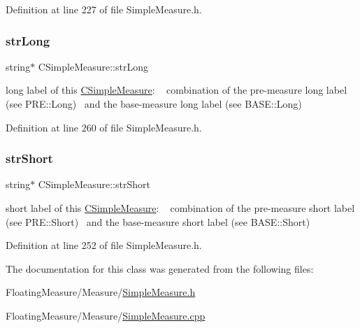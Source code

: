 Definition at line 227 of file Simple\+Measure.\+h.

\mbox{\label{classCSimpleMeasure_a5761fb46fb35ce577066ef1e7ec1ab2e}} 
\subsubsection{\texorpdfstring{str\+Long}{strLong}}
{\footnotesize\ttfamily string$\ast$ C\+Simple\+Measure\+::str\+Long\hspace{0.3cm}{\ttfamily [protected]}}



long label of this \hyperlink{classCSimpleMeasure}{C\+Simple\+Measure}\+: ~\newline
 combination of the pre-\/measure long label (see P\+R\+E\+::\+Long)~\newline
 and the base-\/measure long label (see B\+A\+S\+E\+::\+Long) 



Definition at line 260 of file Simple\+Measure.\+h.

\mbox{\label{classCSimpleMeasure_a39260e6516c163955c34dce6795292ad}} 
\subsubsection{\texorpdfstring{str\+Short}{strShort}}
{\footnotesize\ttfamily string$\ast$ C\+Simple\+Measure\+::str\+Short\hspace{0.3cm}{\ttfamily [protected]}}



short label of this \hyperlink{classCSimpleMeasure}{C\+Simple\+Measure}\+: ~\newline
 combination of the pre-\/measure short label (see P\+R\+E\+::\+Short)~\newline
 and the base-\/measure short label (see B\+A\+S\+E\+::\+Short) 



Definition at line 252 of file Simple\+Measure.\+h.



The documentation for this class was generated from the following files\+:\begin{DoxyCompactItemize}
\item 
Floating\+Measure/\+Measure/\hyperlink{SimpleMeasure_8h}{Simple\+Measure.\+h}\item 
Floating\+Measure/\+Measure/\hyperlink{SimpleMeasure_8cpp}{Simple\+Measure.\+cpp}\end{DoxyCompactItemize}
